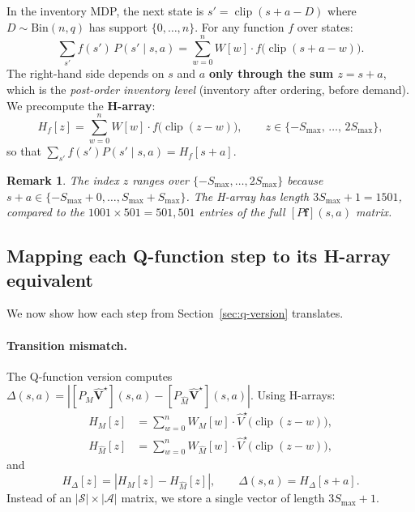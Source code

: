 \documentclass[11pt]{article}
\newcommand{\Smax}{S_{\max}}
\newcommand{\clip}{\operatorname{clip}}
\newcommand{\Vhatstar}{\hat V^\star}
\newtheorem{remark}{Remark}
\begin{document}
In the inventory MDP, the next state is $s' = \clip(s + a - D)$ where
$D \sim \mathrm{Bin}(n, q)$ has support $\{0, \ldots, n\}$.  For any function
$f$ over states:
\begin{equation}\label{eq:h-array-identity}
  \sum_{s'} f(s')\, P(s' \mid s, a)
  = \sum_{w=0}^{n} W[w] \cdot f\bigl(\clip(s + a - w)\bigr).
\end{equation}
The right-hand side depends on $s$ and $a$ \textbf{only through the sum
$z = s + a$}, which is the \emph{post-order inventory level} (inventory after
ordering, before demand).  We precompute the \textbf{H-array}:
\begin{equation}\label{eq:h-array}
  H_f[z] = \sum_{w=0}^{n} W[w] \cdot f\bigl(\clip(z - w)\bigr),
  \qquad z \in \{-\Smax,\, \ldots,\, 2\Smax\},
\end{equation}
so that $\sum_{s'} f(s') P(s' \mid s, a) = H_f[s+a]$.

\begin{remark}
The index $z$ ranges over $\{-\Smax, \ldots, 2\Smax\}$ because
$s + a \in \{-\Smax + 0, \ldots, \Smax + \Smax\}$.  The H-array has length
$3\Smax + 1 = 1501$, compared to the $1001 \times 501 = 501{,}501$ entries of
the full $[P \mathbf{f}](s,a)$ matrix.
\end{remark}

\subsection{Mapping each Q-function step to its H-array equivalent}

We now show how each step from Section~\ref{sec:q-version} translates.

\paragraph{Transition mismatch.}
The Q-function version computes $\Delta(s,a) = |[P_M \hat{\mathbf{V}}^\star](s,a) -
[P_{\hat M} \hat{\mathbf{V}}^\star](s,a)|$.  Using H-arrays:
\begin{align}
  H_M[z] &= \sum_{w=0}^{n} W_M[w] \cdot \Vhatstar\bigl(\clip(z-w)\bigr),
  \label{eq:HM} \\
  H_{\hat M}[z] &= \sum_{w=0}^{n} W_{\hat M}[w] \cdot \Vhatstar\bigl(\clip(z-w)\bigr),
  \label{eq:HMhat}
\end{align}
and
\begin{equation}\label{eq:h-delta}
  H_\Delta[z] = |H_M[z] - H_{\hat M}[z]|,
  \qquad
  \Delta(s,a) = H_\Delta[s+a].
\end{equation}
Instead of an $|\mathcal{S}| \times |\mathcal{A}|$ matrix, we store a single
vector of length $3\Smax + 1$.
\end{document}
